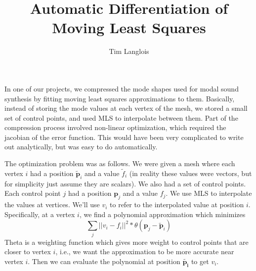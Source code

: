 \documentclass{article}
\title{Automatic Differentiation of Moving Least Squares}
\author{Tim Langlois}
\date{\vspace{-5ex}}
\begin{document}
\maketitle

In one of our projects, we compressed the mode shapes used for modal sound
synthesis by fitting moving least squares approximations to them. Basically,
instead of storing the mode values at each vertex of the mesh, we stored a small
set of control points, and used MLS to interpolate between them. Part of the
compression process involved non-linear optimization, which required the
jacobian of the error function. This would have been very complicated to write
out analytically, but was easy to do automatically.

The optimization problem was as follows. We were given a mesh where each vertex
$i$ had a position $\mathbf{\tilde{p}}_i$ and a value $\tilde{f}_i$ (in reality these values were vectors, but for simplicity
just assume they are scalars). We also had a set of control points. Each control
point $j$ had a position $\mathbf{p}_j$ and a value $f_j$. We use MLS to
interpolate the values at vertices. We'll use $v_i$ to refer to the interpolated
value at position $i$. Specifically, at a vertex $i$, we find a
polynomial approximation which minimizes
\[
    \sum_j || v_i - f_i ||^2 * \theta(\mathbf{p}_j - \mathbf{\tilde{p}}_i)
\]
Theta is a weighting function which gives more weight to control points that are
closer to vertex $i$, i.e., we want the approximation to be more accurate near
vertex $i$. Then we can evaluate the polynomial at position
$\mathbf{\tilde{p_i}}$ to get $v_i$.
\end{document}
